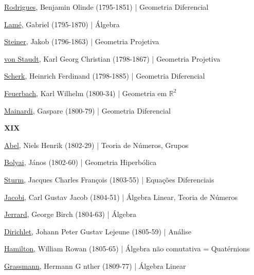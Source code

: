 \documentclass[12pt,a4paper]{article}
\begin{document}
			\href{http://en.wikipedia.org/wiki/Olinde_Rodrigues}{Rodrigues}, Benjamin Olinde (1795-1851) | Geometria Diferencial

			\href{http://pt.wikipedia.org/wiki/Gabriel_Lam\%C3\%A9}{Lam\'e}, Gabriel (1795-1870) | \'Algebra

			\href{http://en.wikipedia.org/wiki/Jakob_Steiner}{Steiner}, Jakob (1796-1863) | Geometria Projetiva

			\href{http://en.wikipedia.org/wiki/Von_Staudt}{von Staudt}, Karl Georg Christian (1798-1867) | Geometria Projetiva

			\href{http://en.wikipedia.org/wiki/Heinrich_Scherk}{Scherk}, Heinrich Ferdinand (1798-1885) | Geometria Diferencial

			\href{http://en.wikipedia.org/wiki/Karl_Wilhelm_Feuerbach}{Feuerbach}, Karl Wilhelm (1800-34) | Geometria em $ \mathbb{R}^2 $

			\href{http://en.wikipedia.org/wiki/Gaspare_Mainardi}{Mainardi}, Gaspare (1800-79) | Geometria Diferencial

			\begin{flushright}
			\end{flushright}

			\textbf{XIX}

			\href{http://pt.wikipedia.org/wiki/Niels_Henrik_Abel}{Abel}, Niels Henrik (1802-29) | Teoria de N\'umeros, Grupos

			\href{http://pt.wikipedia.org/wiki/J\%C3\%A1nos_Bolyai}{Bolyai}, J\'anos (1802-60) | Geometria Hiperb\'olica

			\href{http://en.wikipedia.org/wiki/Jacques_Charles_Fran\%C3\%A7ois_Sturm}{Sturm}, Jacques Charles Fran\c{c}ois (1803-55) | Equa\c{c}\~oes Diferenciais

			\href{http://pt.wikipedia.org/wiki/Carl_Gustav_Jakob_Jacobi}{Jacobi}, Carl Gustav Jacob (1804-51) | \'Algebra Linear, Teoria de N\'umeros

			\href{http://en.wikipedia.org/wiki/George_Jerrard}{Jerrard}, George Birch (1804-63) | \'Algebra

			\href{http://pt.wikipedia.org/wiki/Dirichlet}{Dirichlet}, Johann Peter Gustav Lejeune (1805-59) | An\'alise

			\href{http://pt.wikipedia.org/wiki/William_Rowan_Hamilton}{Hamilton}, William Rowan (1805-65) | \'Algebra n\~ao comutativa = Quat\'ernions

			\href{http://en.wikipedia.org/wiki/Hermann_Grassmann}{Grassmann}, Hermann G nther (1809-77) | \'Algebra Linear
\end{document}
